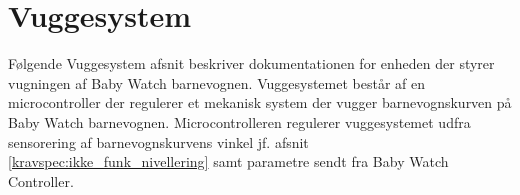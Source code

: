\chapter{Vuggesystem}
Følgende Vuggesystem afsnit beskriver dokumentationen for enheden der styrer vugningen af Baby Watch barnevognen. Vuggesystemet består af en microcontroller der regulerer et mekanisk system der vugger barnevognskurven på Baby Watch barnevognen. Microcontrolleren regulerer vuggesystemet udfra sensorering af barnevognskurvens vinkel jf. afsnit \vref{kravspec:ikke_funk_nivellering} samt parametre sendt fra Baby Watch Controller.



